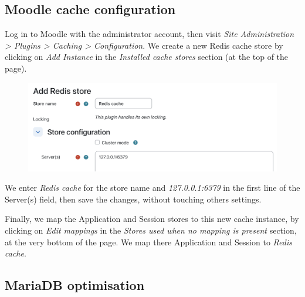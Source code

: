 \documentclass[12pt]{article}
\begin{document}
\subsection{Moodle cache configuration}\label{ssec-cache}

Log in to Moodle with the administrator account, then visit \textsl{Site Administration > Plugins > Caching > Configuration}.
We create a new Redis cache store by clicking on \emph{Add Instance} in the \emph{Installed cache stores} section (at the top of the page).

\begin{figure}[!ht]
\centering
\includegraphics[width=14cm]{cache-redis.png}
\end{figure}

We enter \emph{Redis cache} for the store name and \emph{127.0.0.1:6379} in the first line of the Server(s) field, then save the changes, without touching others settings.

Finally, we map the Application and Session stores to this new cache instance, by clicking on \emph{Edit mappings} in the \emph{Stores used when no mapping is present} section, at the very bottom of the page.
We map there Application and Session to \emph{Redis cache}.

\subsection{MariaDB optimisation}\label{ssec-mariadb-optimisation}
\end{document}

